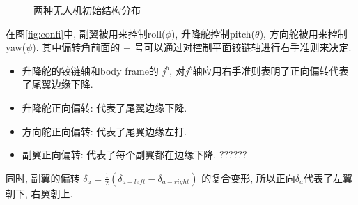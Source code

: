 \documentclass[UTF8,a4paper,10pt,nocolorlinks]{ctexart}
\begin{document}
    \begin{figure}[htpb]
      \centering
      \hspace{0.5in} %
      \caption{两种无人机初始结构分布}
    \end{figure}

    \par 在图\ref{fig:confi}中, 副翼被用来控制roll($\phi$), 升降舵控制pitch($\theta$), 方向舵被用来控制yaw($\psi$). 其中偏转角前面的 $+$ 号可以通过对控制平面铰链轴进行右手准则来决定. 
    \begin{itemize}
      \item 升降舵的铰链轴和body frame的 $j^{b}$, 对$j^{b}$轴应用右手准则表明了正向偏转代表了尾翼边缘下降. 
      \item 升降舵正向偏转: 代表了尾翼边缘下降. 
      \item 方向舵正向偏转: 代表了尾翼边缘左打. 
      \item 副翼正向偏转: 代表了每个副翼都在边缘下降. ?????? 
    \end{itemize}
    同时, 副翼的偏转 $\delta_{a} = \frac{1}{2} (\delta_{a-left} - \delta_{a-right})$ 的复合变形, 所以正向$\delta_{a}$代表了左翼朝下, 右翼朝上. 
\end{document}
